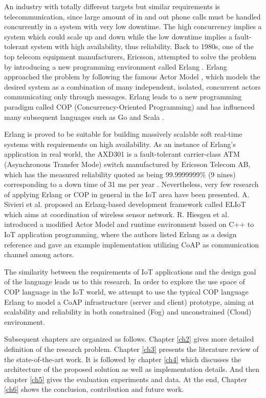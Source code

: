 An industry with totally different targets but similar requirements is telecommunication, since large amount of in and out phone calls must be handled concurrently in a system with very low downtime. The high concurrency implies a system which could scale up and down while the low downtime implies a fault-tolerant system with high availability, thus reliability. Back to 1980s, one of the top telecom equipment manufacturers, Ericsson, attempted to solve the problem by introducing a new programming environment called Erlang \cite{erl}. Erlang approached the problem by following the famous Actor Model \cite{agha1986actors}, which models the desired system as a combination of many independent, isolated, concurrent actors communicating only through messages. Erlang leads to a new programming paradigm called COP (Concurrency-Oriented Programming) \cite{armstrong2003concurrency} and has influenced many subsequent languages such as Go \cite{go} and Scala \cite{scala}.  

Erlang is proved to be suitable for building massively scalable soft real-time systems with requirements on high availability. As an instance of Erlang's application in real world, the AXD301 is a fault-tolerant carrier-class ATM (Asynchronous Transfer Mode) switch manufactured by Ericsson Telecom AB, which has the measured reliability quoted as being 99.9999999\% (9 nines) corresponding to a down time of 31 ms per year \cite{armstrong2003concurrency}. Nevertheless, very few research of applying Erlang or COP in general in the IoT area have been presented. A. Sivieri et al. \cite{Sivieri:2012:DPT:2667049.2667051} proposed an Erlang-based development framework called ELIoT which aims at coordination of wireless sensor network. R. Hiesgen et al. \cite{7034296} introduced a modified Actor Model and runtime environment based on C++ to IoT application programming, where the authors listed Erlang as a design reference and gave an example implementation utilizing CoAP as communication channel among actors.  

The similarity between the requirements of IoT applications and the design goal of the language leads us to this research. In order to explore the use space of COP language in the IoT world, we attempt to use the typical COP language Erlang to model a CoAP infrastructure (server and client) prototype, aiming at scalability and reliability in both constrained (Fog) and unconstrained (Cloud) environment.

Subsequent chapters are organized as follows. Chapter \ref{ch2} gives more detailed definition of the research problem. Chapter \ref{ch3} presents the literature review of the state-of-the-art work. It is followed by chapter \ref{ch4} which discusses the architecture of the proposed solution as well as implementation details. And then chapter \ref{ch5} gives the evaluation experiments and data. At the end, Chapter \ref{ch6} shows the conclusion, contribution and future work.